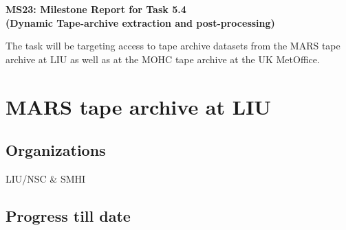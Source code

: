 \documentclass[10pt,one-side,a4paper]{memoir}
\begin{document}
\setlength{\parindent}{0mm}
\begin{center}
\Huge{\textbf{MS23: Milestone Report for Task 5.4 \\(Dynamic Tape-archive extraction and post-processing)}}
\end{center}
The task will be targeting access to tape archive datasets from the MARS tape archive at LIU as well as at the MOHC tape archive at the UK MetOffice. 
\section{MARS tape archive at LIU}
\subsection{Organizations}
LIU/NSC \& SMHI
\subsection{Progress till date}
\end{document}
